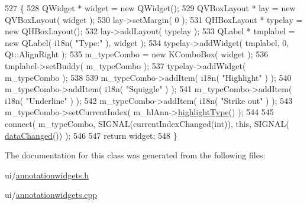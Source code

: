 \begin{DoxyCode}
527 \{
528     QWidget * widget = \textcolor{keyword}{new} QWidget();
529     QVBoxLayout * lay = \textcolor{keyword}{new} QVBoxLayout( widget );
530     lay->setMargin( 0 );
531     QHBoxLayout * typelay = \textcolor{keyword}{new} QHBoxLayout();
532     lay->addLayout( typelay );
533     QLabel * tmplabel = \textcolor{keyword}{new} QLabel( i18n( \textcolor{stringliteral}{"Type:"} ), widget );
534     typelay->addWidget( tmplabel, 0, Qt::AlignRight );
535     m\_typeCombo = \textcolor{keyword}{new} KComboBox( widget );
536     tmplabel->setBuddy( m\_typeCombo );
537     typelay->addWidget( m\_typeCombo );
538 
539     m\_typeCombo->addItem( i18n( \textcolor{stringliteral}{"Highlight"} ) );
540     m\_typeCombo->addItem( i18n( \textcolor{stringliteral}{"Squiggle"} ) );
541     m\_typeCombo->addItem( i18n( \textcolor{stringliteral}{"Underline"} ) );
542     m\_typeCombo->addItem( i18n( \textcolor{stringliteral}{"Strike out"} ) );
543     m\_typeCombo->setCurrentIndex( m\_hlAnn->\hyperlink{classOkular_1_1HighlightAnnotation_a3e95972aebea730877a033f8b2908b90}{highlightType}() );
544 
545     connect( m\_typeCombo, SIGNAL(currentIndexChanged(\textcolor{keywordtype}{int})), \textcolor{keyword}{this}, SIGNAL(
      \hyperlink{classAnnotationWidget_af9dcb02a8b69a602225c9844b5deb6d4}{dataChanged}()) );
546 
547     \textcolor{keywordflow}{return} widget;
548 \}
\end{DoxyCode}


The documentation for this class was generated from the following files\+:\begin{DoxyCompactItemize}
\item 
ui/\hyperlink{annotationwidgets_8h}{annotationwidgets.\+h}\item 
ui/\hyperlink{annotationwidgets_8cpp}{annotationwidgets.\+cpp}\end{DoxyCompactItemize}
